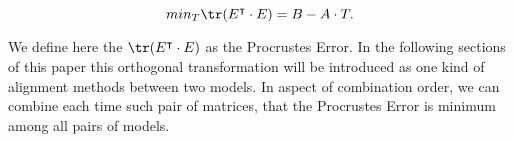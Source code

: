 	\begin{equation}
		min_T \tr (E^\intercal\cdot E) = B-A\cdot T.
	\end{equation}

	We define here the $\tr (E^\intercal \cdot E)$ as the Procrustes Error. In the following sections of this paper this orthogonal transformation will be introduced as one kind of alignment methods between two models. In aspect of combination order, we can combine each time such pair of matrices, that the Procrustes Error is minimum among all pairs of models.